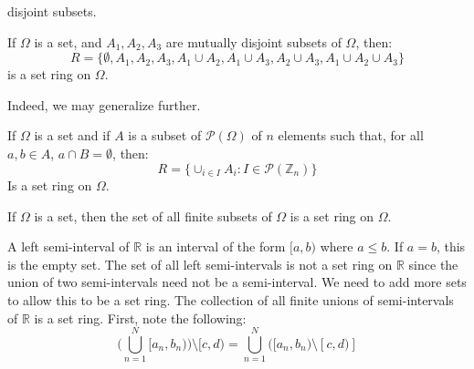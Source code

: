                 disjoint subsets.
                \begin{theorem}
                    If $\Omega$ is a set, and $A_{1},A_{2},A_{3}$ are
                    mutually disjoint subsets of $\Omega$, then:
                    \begin{equation}
                        R=\{\emptyset,A_{1},A_{2},A_{3},
                            A_{1}\cup{A}_{2},A_{1}\cup{A}_{3},
                            A_{2}\cup{A}_{3},
                            A_{1}\cup{A}_{2}\cup{A}_{3}\}
                    \end{equation}
                    is a set ring on $\Omega$.
                \end{theorem}
                Indeed, we may generalize further.
                \begin{theorem}
                    If $\Omega$ is a set and if
                    $A$ is a subset of $\mathcal{P}(\Omega)$ of
                    $n$ elements such that, for all
                    $a,b\in{A}$, $a\cap{B}=\emptyset$, then:
                    \begin{equation}
                        R=\{\cup_{i\in{I}}A_{i}:
                        I\in\mathcal{P}(\mathbb{Z}_{n})\}
                    \end{equation}
                    Is a set ring on $\Omega$.
                \end{theorem}
                \begin{theorem}
                    If $\Omega$ is a set, then the set of all
                    finite subsets of $\Omega$ is a set ring on
                    $\Omega$.
                \end{theorem}
                A left semi-interval of $\mathbb{R}$ is an interval
                of the form $[a,b)$ where $a\leq{b}$. If $a=b$, this
                is the empty set. The set of all left semi-intervals
                is not a set ring on $\mathbb{R}$ since the union
                of two semi-intervals need not be a semi-interval.
                We need to add more sets to allow this to be a
                set ring. The collection of all finite unions of
                semi-intervals of $\mathbb{R}$ is a set ring.
                First, note the following:
                \begin{equation}
                    \Big(\bigcup_{n=1}^{N}[a_{n},b_{n})\Big)
                    \setminus[c,d)=\bigcup_{n=1}^{N}
                    \Big([a_{n},b_{n})\setminus[c,d)]
                \end{equation}
